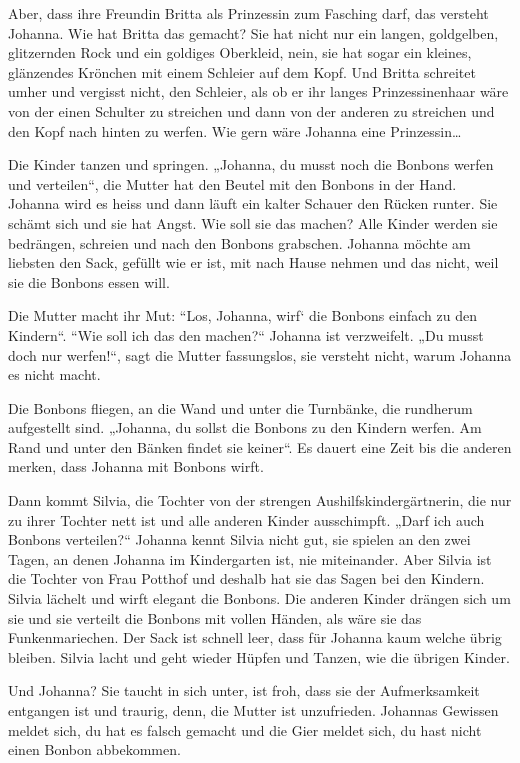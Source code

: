 \documentclass[10pt,titlepage,a5paper]{book}
\begin{document}
Aber, dass ihre Freundin Britta als Prinzessin zum Fasching darf, das versteht Johanna. Wie hat Britta das gemacht? Sie hat  nicht nur ein langen, goldgelben, glitzernden Rock und ein goldiges Oberkleid, nein, sie hat sogar ein kleines, glänzendes Krönchen mit einem Schleier auf dem Kopf. Und Britta schreitet umher und vergisst nicht, den Schleier, als ob er ihr langes Prinzessinenhaar wäre von der einen Schulter zu streichen und dann von der anderen zu streichen und den Kopf nach hinten zu werfen. Wie gern wäre Johanna eine Prinzessin\dots

Die Kinder tanzen und springen. „Johanna, du musst noch die Bonbons werfen und verteilen“, die Mutter hat den Beutel mit den Bonbons in der Hand. Johanna wird es heiss und dann läuft ein kalter Schauer den Rücken runter. Sie schämt sich und sie hat Angst. Wie soll sie das machen? Alle Kinder werden sie bedrängen, schreien und nach den Bonbons grabschen. Johanna möchte am liebsten den Sack, gefüllt wie er ist, mit nach Hause nehmen und das nicht, weil sie die Bonbons essen will. 

Die Mutter macht ihr Mut: “Los, Johanna, wirf` die Bonbons einfach zu den Kindern“. “Wie soll ich das den machen?“ Johanna ist verzweifelt.  „Du musst doch nur werfen!“, sagt die Mutter fassungslos, sie versteht nicht, warum Johanna es nicht macht. 

Die Bonbons fliegen, an die Wand und unter die Turnbänke, die rundherum aufgestellt sind. „Johanna, du sollst die Bonbons zu den Kindern werfen. Am Rand und unter den Bänken findet sie keiner“. Es dauert eine Zeit bis die anderen merken, dass Johanna mit Bonbons wirft. 

Dann kommt Silvia, die Tochter von der strengen Aushilfskindergärtnerin, die nur zu ihrer Tochter nett ist und alle anderen Kinder ausschimpft. „Darf ich auch Bonbons verteilen?“ Johanna kennt Silvia nicht gut, sie spielen an den zwei Tagen, an denen Johanna im Kindergarten ist, nie miteinander. Aber Silvia ist die Tochter von Frau Potthof und deshalb hat sie das Sagen bei den Kindern.  Silvia lächelt und wirft elegant die Bonbons. Die anderen Kinder drängen sich um sie und sie verteilt die Bonbons mit vollen Händen, als wäre sie das Funkenmariechen. Der Sack ist schnell leer, dass für Johanna kaum welche übrig bleiben. Silvia lacht und geht wieder Hüpfen und Tanzen, wie die übrigen Kinder. 

Und Johanna? Sie taucht in sich unter, ist froh, dass sie der Aufmerksamkeit entgangen ist und traurig, denn, die Mutter ist unzufrieden. Johannas Gewissen meldet sich, du hat es falsch gemacht und die Gier meldet sich, du hast nicht einen Bonbon abbekommen. 
\end{document}

